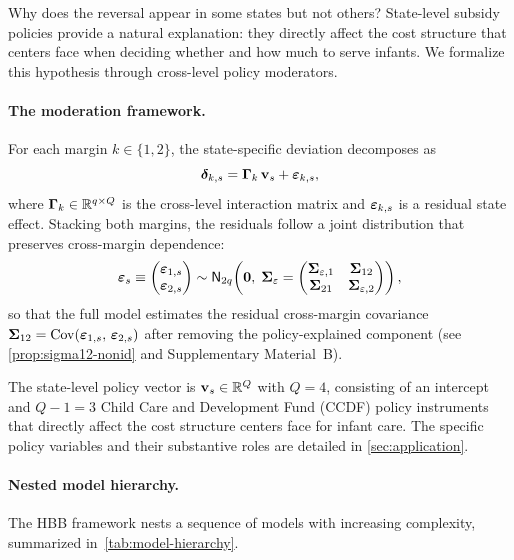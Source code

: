 Why does the reversal appear in some states but not others?  State-level
subsidy policies provide a natural explanation: they directly affect the cost
structure that centers face when deciding whether and how much to serve infants.
We formalize this hypothesis through cross-level policy moderators.

\paragraph{The moderation framework.}
\begin{definition}\label{def:gamma}
  For each margin $k \in \{1,2\}$, the state-specific deviation decomposes as
  \begin{equation}\label{eq:gamma-decomp}
    \boldsymbol{\delta}_{k,s} = \boldsymbol{\Gamma}_k\,\mathbf{v}_s + \boldsymbol{\varepsilon}_{k,s},
  \end{equation}
  where $\boldsymbol{\Gamma}_k \in \mathbb{R}^{q \times Q}$ is the cross-level interaction matrix
  and $\boldsymbol{\varepsilon}_{k,s}$ is a residual state effect.
  Stacking both margins, the residuals follow a joint distribution that
  preserves cross-margin dependence:
  \begin{equation}\label{eq:eps-stacked}
    \boldsymbol{\varepsilon}_s
    \equiv \begin{pmatrix}\boldsymbol{\varepsilon}_{1,s}\\\boldsymbol{\varepsilon}_{2,s}\end{pmatrix}
    \sim \textsf{N}_{2q}\!\left(\mathbf{0},\;
      \boldsymbol{\Sigma}_\varepsilon
      = \begin{pmatrix}
        \boldsymbol{\Sigma}_{\varepsilon,1} & \boldsymbol{\Sigma}_{12}\\
        \boldsymbol{\Sigma}_{21} & \boldsymbol{\Sigma}_{\varepsilon,2}
      \end{pmatrix}\right),
  \end{equation}
  so that the full model estimates the residual cross-margin covariance
  $\boldsymbol{\Sigma}_{12} = \operatorname*{Cov}(\boldsymbol{\varepsilon}_{1,s},\, \boldsymbol{\varepsilon}_{2,s})$
  after removing the policy-explained component (see
  \cref{prop:sigma12-nonid} and Supplementary Material~B).
\end{definition}

The state-level policy vector is
$\mathbf{v}_s \in \mathbb{R}^Q$ with $Q = 4$, consisting of an intercept and $Q - 1 = 3$
Child Care and Development Fund (CCDF) policy instruments that directly affect
the cost structure centers face for infant care.  The specific policy variables
and their substantive roles are detailed in \cref{sec:application}.

\paragraph{Nested model hierarchy.}
The HBB framework nests a sequence of models with increasing complexity,
summarized in~\cref{tab:model-hierarchy}.

